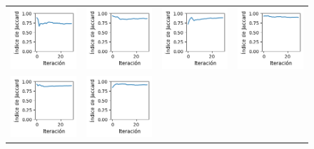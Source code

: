 \begin{figure}[!b]
    \centering
    \begin{tabular}{cccc}
        \includegraphics[width=3.5cm]{../Plots/score_epoch_0.png} &
        \includegraphics[width=3.5cm]{../Plots/score_epoch_1.png} &
        \includegraphics[width=3.5cm]{../Plots/score_epoch_2.png} &
        \includegraphics[width=3.5cm]{../Plots/score_epoch_3.png} \\
        \includegraphics[width=3.5cm]{../Plots/score_epoch_4.png} &
        \includegraphics[width=3.5cm]{../Plots/score_epoch_5.png} &

\end{tabular}
\end{figure}

